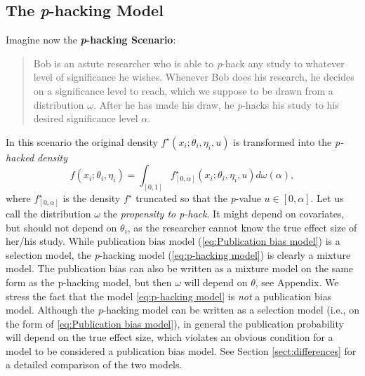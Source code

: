 \documentclass[preprint, authoryear]{elsarticle}
\theoremstyle{plain}
\theoremstyle{definition}
\begin{document}
\subsection{The \emph{p}-hacking Model}\label{subsect:p-hacking}

Imagine now the \textbf{\emph{p}}\textbf{-hacking Scenario}:
\begin{quote}
Bob is an astute researcher who is able to \emph{p}-hack any study to whatever level of significance he wishes. Whenever Bob does his research, he decides on a significance level to reach, which we suppose to be drawn from a distribution $\omega$. After he has made his draw, he \emph{p}-hacks his study to his desired significance level $\alpha$.
\end{quote}
In this scenario the original density $f^{\star}\left(x_{i};\theta_{i},\eta_{i}, u\right)$
is transformed into the \emph{p-hacked density}
\begin{equation}\label{eq:p-hacking model}
f\left(x_{i};\theta_{i},\eta_{i}\right)=\int_{[0,1]}f_{\left[0,\alpha\right]}^{\star}\left(x_{i};\theta_{i},\eta_{i}, u\right)d\omega\left(\alpha\right),
\end{equation}
where $f_{\left[0,\alpha\right]}^{\star}$ is the density $f^{\star}$ truncated so that the \emph{p}-value $u\in\left[0,\alpha\right]$. Let us call the distribution $\omega$ the \emph{propensity to p-hack}. It might depend on covariates, but should not depend on $\theta_{i}$, as the researcher cannot know the true effect size of her/his study. While publication bias model (\ref{eq:Publication bias model}) is a selection model, the \emph{p}-hacking model (\ref{eq:p-hacking model}) is clearly a mixture model. The publication bias can also be written as a mixture model on the same form as the p-hacking model, but then $\omega$ will depend on $\theta$, see Appendix. We stress the fact that the model \eqref{eq:p-hacking model} is \emph{not} a publication bias model. Although the \emph{p}-hacking model can be written as a selection model (i.e., on the form of \eqref{eq:Publication bias model}), in general the publication probability will depend on the true effect size, which violates an obvious condition for a model to be considered a publication bias model. See Section \ref{sect:differences} for a detailed comparison of the two models.
\end{document}
